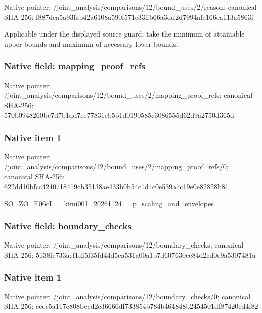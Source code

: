 \documentclass[10pt,a4paper]{article}
\begin{document}
Native pointer: /joint\_analysis/comparis\allowbreak{}ons/12/bound\_uses/2/reas\allowbreak{}on; canonical SHA-256: f887dea5a93fab42a6108a59\allowbreak{}0f571c33ffb66a3dd2d7994a\allowbreak{}fe166ca113a5863f


Applicable under the displayed source guard; take the minimum of attainable upper bounds and maximum of necessary lower bounds.


\subsubsection{Native field: mapping\_proof\_refs}


Native pointer: /joint\_analysis/comparis\allowbreak{}ons/12/bound\_uses/2/mapp\allowbreak{}ing\_proof\_refs; canonical SHA-256: 570b0948260bc7d7b1dd7ee7\allowbreak{}7831eb5b1d0190585c308655\allowbreak{}5d62d9a2750d365d



\subsubsection{Native item 1}


Native pointer: /joint\_analysis/comparis\allowbreak{}ons/12/bound\_uses/2/mapp\allowbreak{}ing\_proof\_refs/0; canonical SHA-256: 622dd10bfcc4240718419cb3\allowbreak{}5138ae433b0b54c1d4c0e539\allowbreak{}a7c19e0e82828b81


SO\_ZO\_E06cL\_\_kimi001\_202\allowbreak{}61124\_\_p\_scaling\_and\_env\allowbreak{}elopes


\subsubsection{Native field: boundary\_checks}


Native pointer: /joint\_analysis/comparis\allowbreak{}ons/12/boundary\_checks; canonical SHA-256: 5138fc733aef1df5f35fd44d\allowbreak{}5ea531a00a1b7d607630ce84\allowbreak{}d2cd0e9a5307481a



\subsubsection{Native item 1}


Native pointer: /joint\_analysis/comparis\allowbreak{}ons/12/boundary\_checks/0; canonical SHA-256: ecee5a117c808becd2c36666\allowbreak{}df733854b784b464848b2454\allowbreak{}501df87420cd4f82
\end{document}
